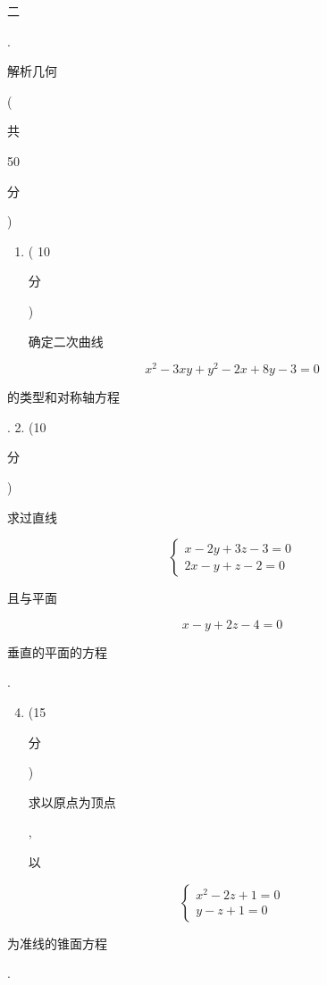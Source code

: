 \documentclass[10pt]{article}
\begin{document}
\begin{CJK}{UTF8}{mj}二\end{CJK}. \begin{CJK}{UTF8}{mj}解析几何\end{CJK} (\begin{CJK}{UTF8}{mj}共\end{CJK} 50 \begin{CJK}{UTF8}{mj}分\end{CJK})

\begin{enumerate}
  \item ( 10 \begin{CJK}{UTF8}{mj}分\end{CJK}) \begin{CJK}{UTF8}{mj}确定二次曲线\end{CJK}
\end{enumerate}
$$
x^{2}-3 x y+y^{2}-2 x+8 y-3=0
$$
\begin{CJK}{UTF8}{mj}的类型和对称轴方程\end{CJK}. 2. (10 \begin{CJK}{UTF8}{mj}分\end{CJK}) \begin{CJK}{UTF8}{mj}求过直线\end{CJK}
$$
\left\{\begin{array}{l}
x-2 y+3 z-3=0 \\
2 x-y+z-2=0
\end{array}\right.
$$
\begin{CJK}{UTF8}{mj}且与平面\end{CJK}
$$
x-y+2 z-4=0
$$
\begin{CJK}{UTF8}{mj}垂直的平面的方程\end{CJK}.

\begin{enumerate}
  \setcounter{enumi}{3}
  \item (15 \begin{CJK}{UTF8}{mj}分\end{CJK}) \begin{CJK}{UTF8}{mj}求以原点为顶点\end{CJK}, \begin{CJK}{UTF8}{mj}以\end{CJK}
\end{enumerate}
$$
\left\{\begin{array}{l}
x^{2}-2 z+1=0 \\
y-z+1=0
\end{array}\right.
$$
\begin{CJK}{UTF8}{mj}为准线的锥面方程\end{CJK}.
\end{document}
